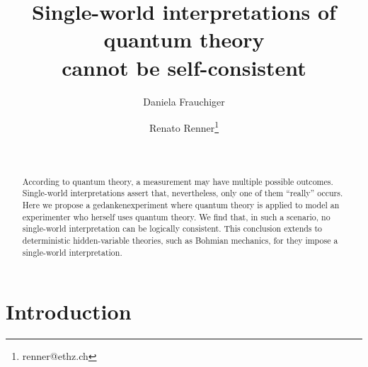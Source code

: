 \documentclass{article}
\theoremstyle{plain}
\theoremstyle{definition}
\begin{document}
\title{Single-world interpretations of quantum theory \\ cannot be self-consistent}

\author{Daniela Frauchiger \and Renato Renner\thanks{renner@ethz.ch}  \and \\}


\date{}
\maketitle

\begin{abstract}
According to quantum theory, a measurement may have multiple possible outcomes.  Single-world interpretations assert that, nevertheless, only one of them ``really'' occurs.  Here we propose a gedankenexperiment where quantum theory is applied to model an experimenter who herself uses quantum theory. We find that, in such a scenario, no single-world interpretation can be logically consistent.  This conclusion extends to deterministic hidden-variable theories, such as Bohmian mechanics, for they impose a single-world interpretation.
\end{abstract}


\section{Introduction} \label{sec_intro}
\end{document}
